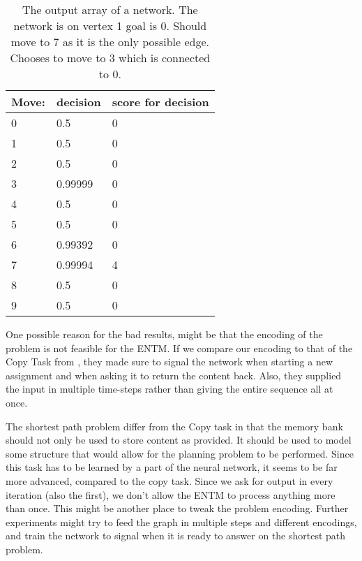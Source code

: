 \begin{table}[H]
	\centering
	\begin{tabular}{|l|l|l|}
		\hline
		Move:&	decision & score for decision\\\hline
		0&	0.5 & 0 \\\hline
		1&	0.5	& 0\\\hline
		2&	0.5	& 0\\\hline
		3&	0.99999 & 0\\\hline
		4&	0.5	& 0\\\hline
		5&	0.5	& 0\\\hline
		6&	0.99392 & 0\\\hline
		7&	0.99994 & 4\\\hline
		8&	0.5 & 0	\\\hline
		9&	0.5 & 0\\\hline
	\end{tabular}
	\caption{The output array of a network. The network is on vertex 1 goal is 0. Should move to 7 as it is the only possible edge. Chooses to move to 3 which is connected to 0.}
	\label{table:analysis:1}
\end{table}

\newpar One possible reason for the bad results, might be that the encoding of the problem is not feasible for the ENTM. If we compare our encoding to that of the Copy Task from \cite{greve2016evolving}, they made sure to signal the network when starting a new assignment and when asking it to return the content back. Also, they supplied the input in multiple time-steps rather than giving the entire sequence all at once.

\newpar The shortest path problem differ from the Copy task in that the memory bank should not only be used to store content as provided. It should be used to model some structure that would allow for the planning problem to be performed. Since this task has to be learned by a part of the neural network, it seems to be far more advanced, compared to the copy task.
Since we ask for output in every iteration (also the first), we don't allow the ENTM to process anything more than once. This might be another place to tweak the problem encoding. Further experiments might try to feed the graph in multiple steps and different encodings, and train the network to signal when it is ready to answer on the shortest path problem.